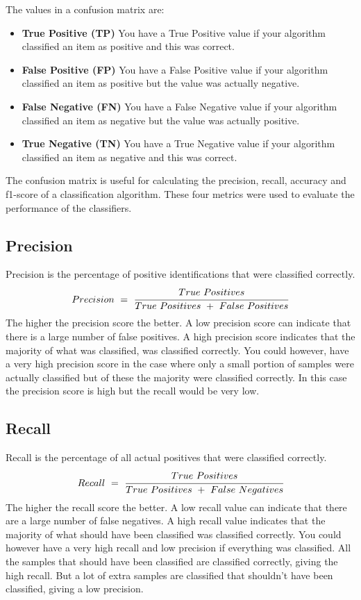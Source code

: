 The values in a confusion matrix are:
\begin{itemize}
    \item \textbf{True Positive (TP)}\newline
    You have a True Positive value if your algorithm classified an item as positive and this was correct.
    \item \textbf{False Positive (FP)}\newline
    You have a False Positive value if your algorithm classified an item as positive but the value was actually negative.
    \item \textbf{False Negative (FN)}\newline
    You have a False Negative value if your algorithm classified an item as negative but the value was actually positive.
    \item \textbf{True Negative (TN)}\newline
    You have a True Negative value if your algorithm classified an item as negative and this was correct.
\end{itemize}

The confusion matrix is useful for calculating the precision, recall, accuracy and f1-score of a classification algorithm. These four metrics were used to evaluate the performance of the classifiers.

\subsection{Precision}
Precision is the percentage of positive identifications that were classified correctly.
\begin{equation}
    Precision\ =\ \cfrac{True\ Positives}{True\ Positives\ +\ False\ Positives}
\end{equation}
The higher the precision score the better. A low precision score can indicate that there is a large number of false positives. A high precision score indicates that the majority of what was classified, was classified correctly. You could however, have a very high precision score in the case where only a small portion of samples were actually classified but of these the majority were classified correctly. In this case the precision score is high but the recall would be very low.

\subsection{Recall}
Recall is the percentage of all actual positives that were classified correctly.
\begin{equation}
    Recall\ =\ \cfrac{True\ Positives}{True\ Positives\ +\ False\ Negatives}
\end{equation}
The higher the recall score the better. A low recall value can indicate that there are a large number of false negatives. A high recall value indicates that the majority of what should have been classified was classified correctly. You could however have a very high recall and low precision if everything was classified. All the samples that should have been classified are classified correctly, giving the high recall. But a lot of extra samples are classified that shouldn't have been classified, giving a low precision.

